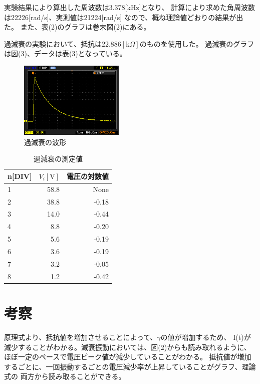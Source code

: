 \documentclass[a4j,10pt]{jarticle}
\begin{document}
実験結果により算出した周波数は3.378[kHz]となり、
計算により求めた角周波数は22226[rad/s]、実測値は21224[rad/s]
なので、概ね理論値どおりの結果が出た。
また、表(2)のグラフは巻末図(2)にある。

過減衰の実験において、抵抗は$22.886[\mathrm k \Omega]$のものを使用した。
過減衰のグラフは図(3)、データは表(3)となっている。
\begin{figure}[h]
\begin{center}
\includegraphics[width=5cm]{over.eps}
\caption{過減衰の波形}
\end{center}
\end{figure}
\begin{table}[h]
\begin{center}
\caption{過減衰の測定値}
\begin{tabular}{|l|r|r|}
\hline
n[DIV]&$V_{i}[\mathrm V]$&電圧の対数値 \\ \hline \hline
1&58.8&None \\ \hline
2&38.8&-0.18 \\ \hline
3&14.0&-0.44 \\ \hline
4&8.8&-0.20 \\ \hline
5&5.6&-0.19  \\ \hline
6&3.6&-0.19  \\ \hline
7&3.2&-0.05  \\ \hline
8&1.2&-0.42  \\ \hline
\end{tabular}
\end{center}
\end{table}
\section{考察}
原理式より、抵抗値を増加させることによって、$\gamma$の値が増加するため、
I(t)が減少することがわかる。減衰振動においては、図(2)からも読み取れるように、
ほぼ一定のペースで電圧ピーク値が減少していることがわかる。
抵抗値が増加するごとに、一回振動するごとの電圧減少率が上昇していることがグラフ、理論式の
両方から読み取ることができる。
\end{document}
